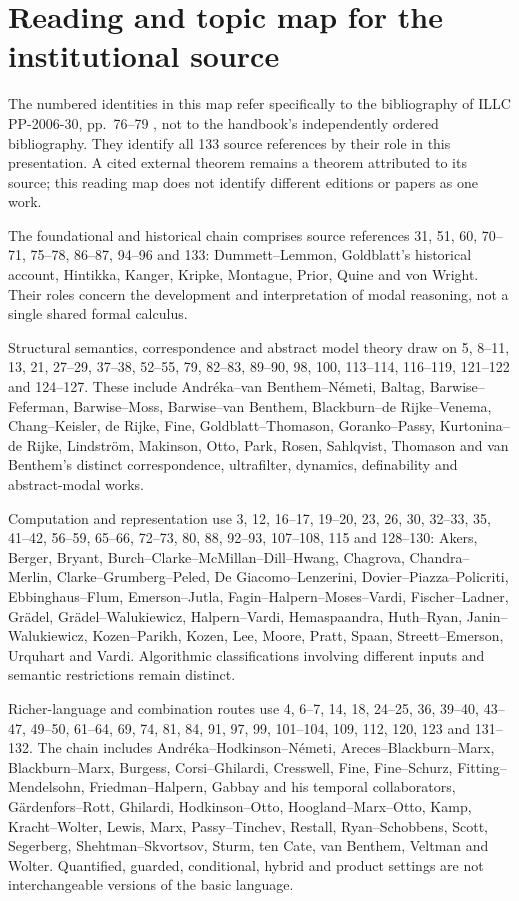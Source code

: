 \section{Reading and topic map for the institutional source}
\label{sec:p08-bvb501-reading-map}

The numbered identities in this map refer specifically to the bibliography
of ILLC PP-2006-30, pp.~76--79 \cite{BlackburnVanBenthem2006ILLC},
not to the handbook's independently ordered bibliography. They identify
all 133 source references by their role in this presentation. A cited
external theorem remains a theorem attributed to its source; this
reading map does not identify different editions or papers as one work.

The foundational and historical chain comprises source references
31, 51, 60, 70--71, 75--78, 86--87, 94--96 and 133:
Dummett--Lemmon, Goldblatt's historical account, Hintikka, Kanger,
Kripke, Montague, Prior, Quine and von Wright. Their roles concern the
development and interpretation of modal reasoning, not a single shared
formal calculus.

Structural semantics, correspondence and abstract model theory draw on
5, 8--11, 13, 21, 27--29, 37--38, 52--55, 79, 82--83, 89--90,
98, 100, 113--114, 116--119, 121--122 and 124--127. These include
Andr\'eka--van Benthem--N\'emeti, Baltag, Barwise--Feferman,
Barwise--Moss, Barwise--van Benthem, Blackburn--de Rijke--Venema,
Chang--Keisler, de Rijke, Fine, Goldblatt--Thomason, Goranko--Passy,
Kurtonina--de Rijke, Lindstr\"om, Makinson, Otto, Park, Rosen,
Sahlqvist, Thomason and van Benthem's distinct correspondence,
ultrafilter, dynamics, definability and abstract-modal works.

Computation and representation use 3, 12, 16--17, 19--20, 23, 26,
30, 32--33, 35, 41--42, 56--59, 65--66, 72--73, 80, 88,
92--93, 107--108, 115 and 128--130: Akers, Berger, Bryant,
Burch--Clarke--McMillan--Dill--Hwang, Chagrova, Chandra--Merlin,
Clarke--Grumberg--Peled, De Giacomo--Lenzerini,
Dovier--Piazza--Policriti, Ebbinghaus--Flum, Emerson--Jutla,
Fagin--Halpern--Moses--Vardi, Fischer--Ladner, Gr\"adel,
Gr\"adel--Walukiewicz, Halpern--Vardi, Hemaspaandra, Huth--Ryan,
Janin--Walukiewicz, Kozen--Parikh, Kozen, Lee, Moore, Pratt,
Spaan, Streett--Emerson, Urquhart and Vardi. Algorithmic classifications
involving different inputs and semantic restrictions remain distinct.

Richer-language and combination routes use 4, 6--7, 14, 18, 24--25,
36, 39--40, 43--47, 49--50, 61--64, 69, 74, 81, 84, 91,
97, 99, 101--104, 109, 112, 120, 123 and 131--132. The chain
includes Andr\'eka--Hodkinson--N\'emeti,
Areces--Blackburn--Marx, Blackburn--Marx, Burgess,
Corsi--Ghilardi, Cresswell, Fine, Fine--Schurz, Fitting--Mendelsohn,
Friedman--Halpern, Gabbay and his temporal collaborators,
G\"ardenfors--Rott, Ghilardi, Hodkinson--Otto,
Hoogland--Marx--Otto, Kamp, Kracht--Wolter, Lewis, Marx,
Passy--Tinchev, Restall, Ryan--Schobbens, Scott, Segerberg,
Shehtman--Skvortsov, Sturm, ten Cate, van Benthem, Veltman and
Wolter. Quantified, guarded, conditional, hybrid and product settings
are not interchangeable versions of the basic language.

